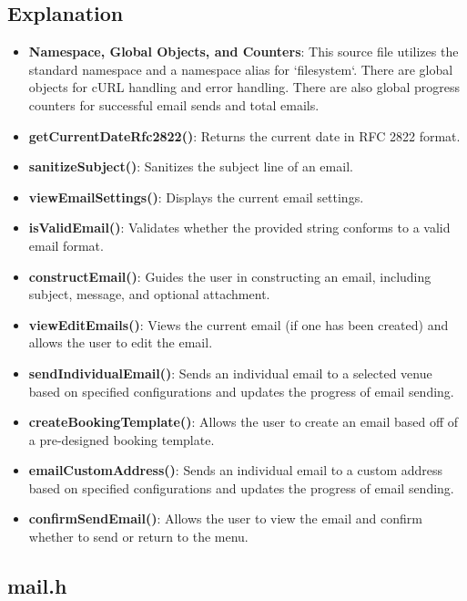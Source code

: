 \documentclass{article}
\begin{document}
	\subsection*{Explanation}
	\begin{itemize}
		\item \textbf{Namespace, Global Objects, and Counters}: This source file utilizes the standard namespace and a namespace alias for `filesystem`. There are global objects for cURL handling and error handling. There are also global progress counters for successful email sends and total emails.
		\item \textbf{getCurrentDateRfc2822()}: Returns the current date in RFC 2822 format.
		\item \textbf{sanitizeSubject()}: Sanitizes the subject line of an email.
		\item \textbf{viewEmailSettings()}: Displays the current email settings.
		\item \textbf{isValidEmail()}: Validates whether the provided string conforms to a valid email format.
		\item \textbf{constructEmail()}: Guides the user in constructing an email, including subject, message, and optional attachment.
		\item \textbf{viewEditEmails()}: Views the current email (if one has been created) and allows the user to edit the email.
		\item \textbf{sendIndividualEmail()}: Sends an individual email to a selected venue based on specified configurations and updates the progress of email sending.
		\item \textbf{createBookingTemplate()}: Allows the user to create an email based off of a pre-designed booking template.
		\item \textbf{emailCustomAddress()}: Sends an individual email to a custom address based on specified configurations and updates the progress of email sending.

		\item \textbf{confirmSendEmail()}: Allows the user to view the email and confirm whether to send or return to the menu.
		
	\end{itemize}
	
	\subsection{mail.h}
	
\end{document}
